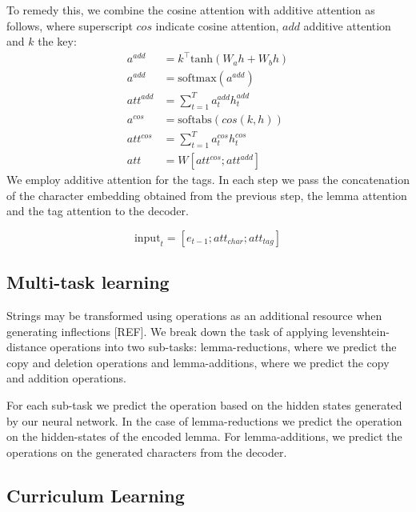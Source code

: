 \documentclass[11pt,a4paper]{article}
\begin{document}
To remedy this, we combine the cosine attention with additive
attention as follows, where superscript $cos$ indicate cosine attention,
$add$ additive attention and $k$ the key:
\begin{align*}
	a^{add} & = k^\top\text{tanh}(W_ah + W_bh)\\
    a^{add} & = \text{softmax}(a^{add})\\
	att^{add} & = \sum_{t=1}^{T}a_t^{add}h_t^{add}\\
	a^{cos} & = \text{softabs}(cos(k,h))\\
	att^{cos} & = \sum_{t=1}^{T}a_t^{cos}h_t^{cos}\\
	att & = W[att^{cos}; att^{add}]
\end{align*}
We employ additive attention for the tags. In each step we pass the
concatenation of the character embedding obtained from the previous
step, the lemma attention and the tag attention to the decoder.

\begin{equation*}
\text{input}_t = [e_{t-1}; att_{char}; att_{tag}]
\end{equation*}



\subsection{Multi-task learning}

Strings may be transformed using operations
as an additional resource when generating inflections [REF]. 
We break down the task of applying levenshtein-distance operations
into two sub-tasks: lemma-reductions, where we predict the copy and
deletion operations and lemma-additions, where we predict the copy and
addition operations. 

For each sub-task we predict the operation based on the hidden states
generated by our neural network. In the case of lemma-reductions we
predict the operation on the hidden-states of the encoded lemma. For
lemma-additions, we predict the operations on the generated characters
from the decoder.

\subsection{Curriculum Learning}
\end{document}

